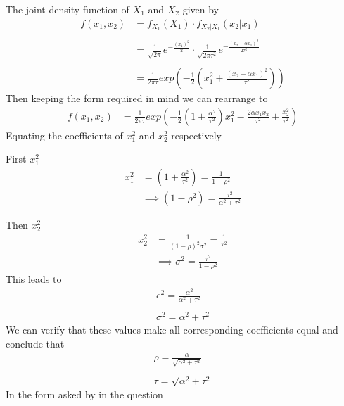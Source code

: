 \documentclass[11pt]{article}
\begin{document}
The joint density function of $X_{1}$ and $X_{2}$ given by
\begin{align*}
  f(x_{1},x_{2}) &= f_{X_{1}}(X_{1}) \cdot f_{X_{2}|X_{1}}(x_{2}|x_{1}) \\ \\
  &= \frac{1}{\sqrt{2\pi}}e^{-\frac{(x_{1})^{2}}{2}} \cdot \frac{1}{\sqrt{2\pi\tau^{2}}}e^{-\frac{(x_{2}-\alpha x_{1})^{2}}{2\tau^{2}}} \\ \\
  &= \frac{1}{2\pi\tau} exp\left(-\frac{1}{2}\left(x_{1}^{2}+\frac{(x_{2}-\alpha x_{1})^{2}}{\tau^{2}}\right)\right)
\end{align*}
Then keeping the form required in mind we can rearrange to
\begin{align*}
  f(x_{1},x_{2}) &= \frac{1}{2\pi\tau} exp\left( -\frac{1}{2}\left( 1 + \frac{\alpha^{2}}{\tau^{2}}\right)x_{1}^{2} -\frac{2\alpha x_{1} x_{2}}{\tau^{2}} + \frac{x_{2}^{2}}{\tau^{2}}\right)
\end{align*}
Equating the coefficients of $x_{1}^{2}$ and $x_{2}^{2}$ respectively

First $x_{1}^{2}$
\begin{align*}
  x_{1}^{2} &= \left( 1 + \frac{\alpha^{2}}{\tau^{2}}\right) = \frac{1}{1-\rho^{2}} \\
  &\implies (1-\rho^{2}) = \frac{\tau^{2}}{\alpha^{2}+\tau^{2}}
\end{align*}

Then $x_{2}^{2}$
\begin{align*}
  x_{2}^{2} &= \frac{1}{(1-\rho)^{2}\sigma^{2}} = \frac{1}{\tau^{2}} \\
  &\implies \sigma^{2} = \frac{\tau^{2}}{1-\rho^{2}}
\end{align*}
This leads to
\begin{align*}
  e^{2}=\frac{\alpha^{2}}{\alpha^{2}+\tau^{2}} \\ \\
  \sigma^{2} = \alpha^{2} + \tau^{2}
\end{align*}
We can verify that these values make all corresponding coefficients equal and conclude that
\begin{align*}
  \rho = \frac{\alpha}{\sqrt{\alpha^{2}+\tau^{2}}} \\\\
  \tau = \sqrt{\alpha^{2}+\tau^{2}}
\end{align*}
In the form asked by in the question
\end{document}
